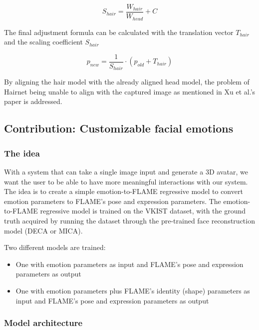 \begin{equation}
    S_{hair} = \frac{W_{hair}}{W_{head}} + C
\end{equation}

The final adjustment formula can be calculated with the translation vector $T_{hair}$ and the scaling coefficient $S_{hair}$

\begin{equation}
    p_{new} = \frac{1}{S_{hair}}\cdot(p_{old} + T_{hair})
\end{equation}

By aligning the hair model with the already aligned head model, the problem of Hairnet being unable to align with the captured image as mentioned in Xu et al.'s paper \cite{xuDeep3DPortrait2020} is addressed.



\subsection{Contribution: Customizable facial emotions}

\subsubsection{The idea}

With a system that can take a single image input and generate a 3D avatar, we want the user to be able to have more meaningful interactions with our system. The idea is to create a simple emotion-to-FLAME regressive model to convert emotion parameters to FLAME's pose and expression parameters. The emotion-to-FLAME regressive model is trained on the VKIST dataset, with the ground truth acquired by running the dataset through the pre-trained face reconstruction model (DECA or MICA).

Two different models are trained:
\begin{itemize}
    \item One with emotion parameters as input and FLAME's pose and expression parameters as output
    \item One with emotion parameters plus FLAME's identity (shape) parameters as input and FLAME's pose and expression parameters as output
\end{itemize}


\subsubsection{Model architecture}

